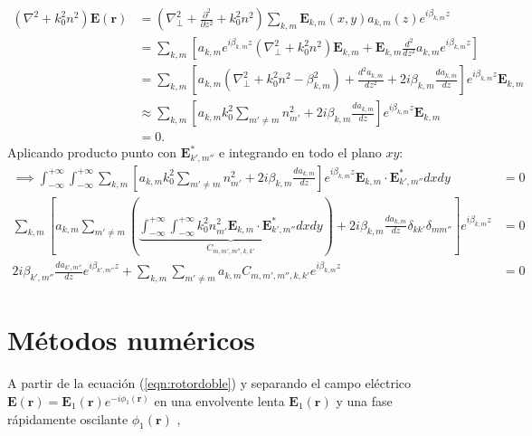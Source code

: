 \begin{align}
	(\nabla^2  + k_0^2n^2) \textbf{E}(\textbf{r}) &= \left(\nabla_\perp^2 + \frac{\partial^2}{\partial z^2} + k_0^2n^2 \right)\sum_{k, m} \textbf{E}_{k, m}(x, y) a_{k, m}(z) e^{i\beta_{k, m} z}
	\nonumber
	\\
	&= \sum_{k, m} \left[a_{k, m} e^{i\beta_{k, m} z} \left(\nabla_\perp^2 +k_0^2n^2 \right)\textbf{E}_{k, m} + \textbf{E}_{k, m}\frac{d^2}{d z^2}a_{k, m} e^{i\beta_{k, m} z}\right]
	\nonumber	
	\\
	&= \sum_{k, m} \left[a_{k, m}  \left(\nabla_\perp^2 +k_0^2n^2 -\beta_{k,m}^2 \right) + \frac{d^2 a_{k, m}}{d z^2}  +2i\beta_{k,m}\frac{d a_{k, m}}{d z} \right]e^{i\beta_{k, m} z}\textbf{E}_{k, m}
		\nonumber	
	\\
	&\approx \sum_{k, m} \left[a_{k, m}  k_0^2\sum_{m'\neq m} n^2_{m'} +2i\beta_{k,m}\frac{d a_{k, m}}{d z} \right]e^{i\beta_{k, m} z}\textbf{E}_{k, m}
	\nonumber	
	\\
	&= 0.
	\nonumber	
\end{align}
Aplicando producto punto con $\textbf{E}_{k', m''}^*$ e integrando en todo el plano $xy$:
\begin{align}
	\implies 
	  \int_{-\infty}^{+\infty}\int_{-\infty}^{+\infty} \sum_{k, m} \left[a_{k, m}  k_0^2\sum_{m'\neq m} n^2_{m'}  +2i\beta_{k,m}\frac{d a_{k, m}}{d z} \right]e^{i\beta_{k, m} z}\textbf{E}_{k, m} \cdot \textbf{E}_{k', m''}^* dxdy &= 0
	  \nonumber
	  \\
	  \sum_{k, m} \left[a_{k, m}  \sum_{m'\neq m}\left( \underbrace{\int_{-\infty}^{+\infty}\int_{-\infty}^{+\infty} k_0^2n^2_{m'} \textbf{E}_{k, m} \cdot \textbf{E}_{k', m''}^* dxdy}_{C_{m, m', m'', k, k'}}\right) +2i\beta_{k,m}\frac{d a_{k, m}}{d z}\delta_{kk'}\delta_{mm''} \right]e^{i\beta_{k, m} z} &= 0
	  	  \nonumber
	  \\
2i\beta_{k',m''}\frac{d a_{k', m''}}{d z}e^{i\beta_{k', m''} z} +	  \sum_{k, m} \sum_{m'\neq m}  a_{k, m}  C_{m, m', m'', k, k'}e^{i\beta_{k, m} z}   &= 0
	\label{eqn:CMT1}
\end{align}

	


\section{Métodos numéricos}

A partir de la ecuación (\ref{eqn:rotordoble}) y separando el campo eléctrico $\textbf{E}(\textbf{r}) = \textbf{E}_1(\textbf{r}) e^{-i \phi_1 (\textbf{r})}$ en una envolvente lenta $\textbf{E}_1(\textbf{r})$ y una fase rápidamente oscilante $\phi_1 (\textbf{r})$ ,

